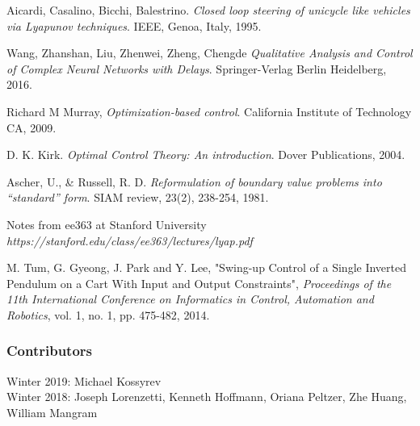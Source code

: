 \documentclass[twoside]{article}
\begin{document}
\begin{thebibliography}{9}
Aicardi, Casalino, Bicchi, Balestrino.
\textit{Closed loop steering of unicycle like vehicles via Lyapunov techniques}.
IEEE, Genoa, Italy, 1995.


Wang, Zhanshan, Liu, Zhenwei, Zheng, Chengde
\textit{Qualitative Analysis and Control of Complex Neural Networks with Delays}.
Springer-Verlag Berlin Heidelberg,  2016.


Richard M Murray, \textit{Optimization-based control}. California Institute of Technology CA, 2009.

D. K. Kirk. \textit{Optimal Control Theory: An introduction}. Dover Publications, 2004.

Ascher, U., \& Russell, R. D. \textit{Reformulation of boundary value problems into ``standard'' form}. SIAM review, 23(2), 238-254, 1981.

Notes from ee363 at Stanford University
\textit{https://stanford.edu/class/ee363/lectures/lyap.pdf}

M. Tum, G. Gyeong, J. Park and Y. Lee, "Swing-up Control of a Single Inverted Pendulum on a Cart With Input and Output Constraints", \textit{Proceedings of the 11th International Conference on Informatics in Control, Automation and Robotics}, vol. 1, no. 1, pp. 475-482, 2014.

\end{thebibliography}

\subsubsection*{Contributors}
Winter 2019: Michael Kossyrev
\\
Winter 2018: Joseph Lorenzetti, Kenneth Hoffmann, Oriana Peltzer, Zhe Huang, William Mangram
\end{document}
